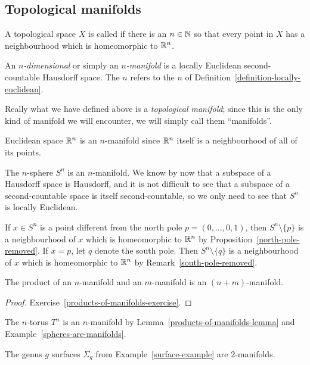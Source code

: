 \subsection{Topological manifolds}
\begin{defn}
  \label{definition-locally-euclidean}
  A topological space $X$ is called  if there is an $n \in \mathbb{N}$ so that every point in $X$ has a neighbourhood which is homeomorphic to $\mathbb{R}^n$.
\end{defn}
\begin{defn}
  An \emph{$n$-dimensional}  or simply an \emph{$n$-manifold} is a locally Euclidean second-countable Hausdorff space. The $n$ refers to the $n$ of Definition~\ref{definition-locally-euclidean}.
\end{defn}
Really what we have defined above is a \emph{topological manifold}; since this is the only kind of manifold we will encounter, we will simply call them ``manifolds''.
\begin{example}
  Euclidean space $\mathbb{R}^n$ is an $n$-manifold since $\mathbb{R}^n$ itself is a neighbourhood of all of its points.
\end{example}
\begin{example}
  \label{spheres-are-manifolds}
  The $n$-sphere $S^n$ is an $n$-manifold. We know by now that a subspace of a Hausdorff space is Hausdorff, and it is not difficult to see that a subspace of a second-countable space is itself second-countable, so we only need to see that $S^n$ is locally Euclidean.
  
  If $x \in S^n$ is a point different from the north pole $p = (0,\dots,0,1)$, then $S^n \setminus \{p\}$ is a neighbourhood of $x$ which is homeomorphic to $\mathbb{R}^n$ by Proposition~\ref{north-pole-removed}. If $x = p$, let $q$ denote the south pole. Then $S^n \setminus \{q\}$ is a neighbourhood of $x$ which is homeomorphic to $\mathbb{R}^n$ by Remark~\ref{south-pole-removed}.
\end{example}
\begin{lem}
  \label{products-of-manifolds-lemma}
  The product of an $n$-manifold and an $m$-manifold is an $(n+m)$-manifold.
\end{lem}
\begin{proof}
  Exercise~\ref{products-of-manifolds-exercise}.
\end{proof}
\begin{example}
  The $n$-torus $T^n$ is an $n$-manifold by Lemma~\ref{products-of-manifolds-lemma} and Example~\ref{spheres-are-manifolds}.
\end{example}
\begin{example}
  The genus $g$ surfaces $\Sigma_g$ from Example~\ref{surface-example} are $2$-manifolds.
\end{example}

